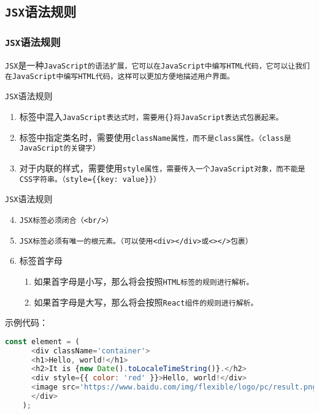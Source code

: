 \documentclass{beamer}
\begin{document}
\subsection{\texttt{JSX}语法规则}
\begin{frame}
  \frametitle{\texttt{JSX}语法规则}
  \texttt{JSX}是一种\tt{JavaScript}的语法扩展，它可以在\tt{JavaScript}中编写\tt{HTML}代码，它可以让我们在\tt{JavaScript}中编写\tt{HTML}代码，这样可以更加方便地描述用户界面。

  \vspace{1em}

  \begin{block}{\texttt{JSX}语法规则}

    \begin{enumerate}
      \item 标签中混入\tt{JavaScript}表达式时，需要用\tt{\{\}}将\tt{JavaScript}表达式包裹起来。
      \item 标签中指定类名时，需要使用\tt{className}属性，而不是\tt{class}属性。（\tt{class}是\tt{JavaScript}的关键字）
      \item 对于内联的样式，需要使用\tt{style}属性，需要传入一个\tt{JavaScript}对象，而不能是\tt{CSS}字符串。（\texttt{style=\{\{key: value\}\}}）
    \end{enumerate}
  \end{block}

  \framebreak

  \begin{block}{\texttt{JSX}语法规则}
    \begin{enumerate}
      \setcounter{enumi}{3}
      \item \tt{JSX}标签必须闭合（\tt{<br/>}）
      \item \tt{JSX}标签必须有唯一的根元素。（可以使用\tt{<div></div>}或\tt{<></>}包裹）
      \item 标签首字母
            \begin{enumerate}
              \item 如果首字母是小写，那么将会按照\tt{HTML}标签的规则进行解析。
              \item 如果首字母是大写，那么将会按照\tt{React}组件的规则进行解析。
            \end{enumerate}
    \end{enumerate}
  \end{block}

  \framebreak

  示例代码：

  \begin{lstlisting}[language=JavaScript]
    const element = (
      <div className='container'>
      <h1>Hello, world!</h1>
      <h2>It is {new Date().toLocaleTimeString()}.</h2>
      <div style={{ color: 'red' }}>Hello, world!</div>
      <image src='https://www.baidu.com/img/flexible/logo/pc/result.png' />
      </div>
    );
\end{lstlisting}
\end{frame}
\end{document}
